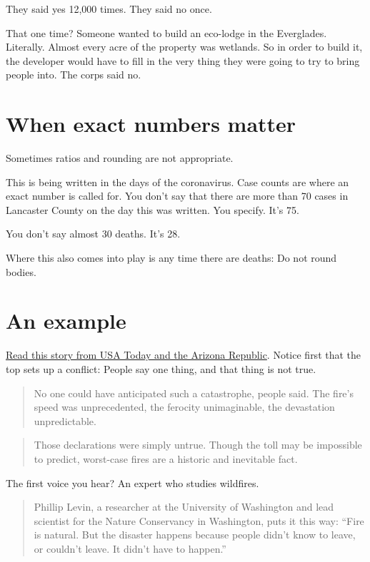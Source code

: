 \documentclass[
  letterpaper,
  DIV=11,
  numbers=noendperiod]{scrreprt}
\begin{document}
They said yes 12,000 times. They said no once.

That one time? Someone wanted to build an eco-lodge in the Everglades.
Literally. Almost every acre of the property was wetlands. So in order
to build it, the developer would have to fill in the very thing they
were going to try to bring people into. The corps said no.

\hypertarget{when-exact-numbers-matter}{%
\section{When exact numbers matter}\label{when-exact-numbers-matter}}

Sometimes ratios and rounding are not appropriate.

This is being written in the days of the coronavirus. Case counts are
where an exact number is called for. You don't say that there are more
than 70 cases in Lancaster County on the day this was written. You
specify. It's 75.

You don't say almost 30 deaths. It's 28.

Where this also comes into play is any time there are deaths: Do not
round bodies.

\hypertarget{an-example}{%
\section{An example}\label{an-example}}

\href{https://www.azcentral.com/in-depth/news/local/arizona-wildfires/2019/07/22/wildfire-risks-more-than-500-spots-have-greater-hazard-than-paradise/1434502001/}{Read
this story from USA Today and the Arizona Republic}. Notice first that
the top sets up a conflict: People say one thing, and that thing is not
true.

\begin{quote}
No one could have anticipated such a catastrophe, people said. The
fire's speed was unprecedented, the ferocity unimaginable, the
devastation unpredictable.
\end{quote}

\begin{quote}
Those declarations were simply untrue. Though the toll may be impossible
to predict, worst-case fires are a historic and inevitable fact.
\end{quote}

The first voice you hear? An expert who studies wildfires.

\begin{quote}
Phillip Levin, a researcher at the University of Washington and lead
scientist for the Nature Conservancy in Washington, puts it this way:
``Fire is natural. But the disaster happens because people didn't know
to leave, or couldn't leave. It didn't have to happen.''
\end{quote}
\end{document}
